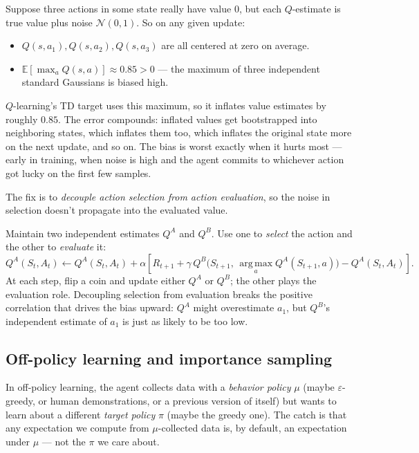 \documentclass[11pt, oneside]{book}
\newcommand{\E}{\mathbb{E}}              %
\newcommand{\argmax}{\operatorname*{arg\,max}}
\newcommand{\Normal}{\mathcal{N}}
\begin{document}
\begin{intbox}[title={Why max gets it wrong (concrete numbers)}]
Suppose three actions in some state really have value $0$, but each $Q$-estimate
is true value plus noise $\Normal(0, 1)$. So on any given update:
\begin{itemize}
  \item $Q(s, a_1), Q(s, a_2), Q(s, a_3)$ are all centered at zero on average.
  \item $\E[\max_a Q(s, a)] \approx 0.85 > 0$ --- the maximum of three independent
    standard Gaussians is biased high.
\end{itemize}
$Q$-learning's TD target uses this maximum, so it inflates value estimates by
roughly $0.85$. The error compounds: inflated values get bootstrapped into
neighboring states, which inflates them too, which inflates the original state more
on the next update, and so on.
The bias is worst exactly when it hurts most --- early in training, when noise is
high and the agent commits to whichever action got lucky on the first few samples.
\end{intbox}

The fix is to \emph{decouple action selection from action evaluation}, so the noise
in selection doesn't propagate into the evaluated value.

\begin{defbox}[title={Double Q-Learning}]
Maintain two independent estimates $Q^A$ and $Q^B$.
Use one to \emph{select} the action and the other to \emph{evaluate} it:
\[
  Q^A(S_t,A_t) \leftarrow Q^A(S_t,A_t)
    + \alpha\!\left[R_{t+1} + \gamma\, Q^B\!\bigl(S_{t+1},\, \argmax_a Q^A(S_{t+1},a)\bigr) - Q^A(S_t,A_t)\right].
\]
At each step, flip a coin and update either $Q^A$ or $Q^B$; the other plays the
evaluation role.
Decoupling selection from evaluation breaks the positive correlation that drives
the bias upward: $Q^A$ might overestimate $a_1$, but $Q^B$'s independent estimate
of $a_1$ is just as likely to be too low.
\end{defbox}

\subsection{Off-policy learning and importance sampling}

In off-policy learning, the agent collects data with a \emph{behavior policy} $\mu$
(maybe $\varepsilon$-greedy, or human demonstrations, or a previous version of itself)
but wants to learn about a different \emph{target policy} $\pi$ (maybe the greedy one).
The catch is that any expectation we compute from $\mu$-collected data is, by default,
an expectation under $\mu$ --- not the $\pi$ we care about.
\end{document}
